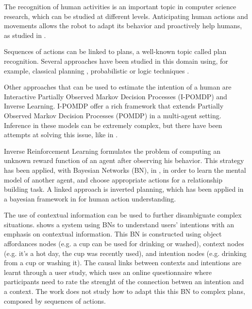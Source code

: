The recognition of human activities is an important topic in computer science research, which can be studied at different levels. Anticipating human actions and movements allows the robot to adapt its behavior and proactively help humans, as studied in \cite{koppula2013anticipating}. 

Sequences of actions can be linked to plans, a well-known topic called plan recognition. Several approaches have been studied in this domain using, for example, classical planning \cite{ramirez2009plan}, probabilistic \cite{bui2003general} or logic techniques \cite{singla2011abductive}.

Other approaches that can be used to estimate the intention of a human are Interactive Partially Observed Markov Decision Processes (I-POMDP) and Inverse Learning. I-POMDP  \cite{gmytrasiewicz2004interactive} offer a rich framework that extends Partially Observed Markov Decision Processes (POMDP) in a multi-agent setting. Inference in these models can be extremely complex, but there have been attempts at solving this issue, like in \cite{doshi2009monte,hoang2013interactive}. 

Inverse Reinforcement Learning \cite{ng2000algorithms} formulates the problem of computing an unknown reward function of an agent after observing his behavior. This strategy has been applied, with Bayesian Networks (BN), in \cite{Nagai2015}, in order to learn the mental model of another agent, and choose appropriate actions for a relationship building task. A linked approach is inverted planning, which has been applied in a bayesian framework in \cite{baker2009action}  for human action understanding.

The use of contextual information can be used to further disambiguate complex situations. \cite{Liu2014} shows a system using BNs to understand users' intentions with an emphasis on contextual information. This BN is constructed using object affordances nodes (e.g. a cup can be used for drinking or washed), context nodes (e.g. it's a hot day, the cup was recently used), and intention nodes (e.g. drinking from a cup or washing it). The causal links between contexts and intentions are learnt through a user study, which uses an online questionnaire where participants need to rate the strenght of the connection betwen an intention and a context. The work does not study how to adapt this this BN to complex plans, composed by sequences of actions.

